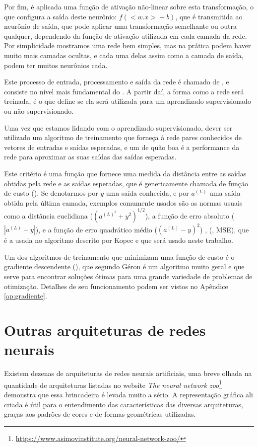 Por fim, é aplicada uma função de ativação não-linear sobre esta transformação, o que configura a saída deste neurônio: $f({<w.x>} + b)$, que é transmitida ao neurônio de saída, que pode aplicar uma transformação semelhante ou outra qualquer, dependendo da função de ativação utilizada em cada camada da rede. Por simplicidade mostramos uma rede bem simples, mas na prática podem haver muito mais camadas ocultas, e cada uma delas assim como a camada de saída, podem ter muitos neurônios cada.

Este processo de entrada, processamento e saída da rede é chamado de , e consiste no nível mais fundamental do . A partir daí, a forma como a rede será treinada, é o que define se ela será utilizada para um aprendizado supervisionado ou não-supervisionado.

Uma vez que estamos lidando com o aprendizado supervisionado, dever ser utilizado um algoritmo de treinamento que forneça à rede pares conhecidos de vetores de entradas e saídas esperadas, e um  de quão boa é a performance da rede para aproximar as suas saídas das saídas esperadas. 

Este critério é uma função que fornece uma medida da distância entre as saídas obtidas pela rede e as saídas esperadas, que é genericamente chamada de função de custo (). Se denotarmos por $y$ uma saída conhecida, e por $a^{(L)}$ uma saída obtida pela última camada, exemplos comumente usados são as normas usuais como a distância euclidiana ($(a^{(L)^2} + y^2)^{1/2}$), a função de erro absoluto ($|a^{(L)} - y|$), e a função de erro quadrático médio ($(a^{(L)} - y)^2$) , (, MSE), que é a usada no algoritmo descrito por Kopec \citep{classic} e que será usado neste trabalho.

Um dos algoritmos de treinamento que minimizam uma função de custo é o gradiente descendente (), que segundo Géron \citep{hands} é um algoritmo muito geral e que serve para encontrar soluções ótimas para uma grande variedade de problemas de otimização. Detalhes de seu funcionamento podem ser vistos no Apêndice \ref{ap:gradiente}.

\section{Outras arquiteturas de redes neurais}

Existem dezenas de arquiteturas de redes neurais artificiais, uma breve olhada na quantidade de arquiteturas listadas no website \emph{The neural network zoo}\footnote{\url{https://www.asimovinstitute.org/neural-network-zoo/}} demonstra que essa brincadeira é levada muito a sério. A representação gráfica ali criada é útil para o entendimento das características das diversas arquiteturas, graças aos padrões de cores e de formas geométricas utilizadas.

